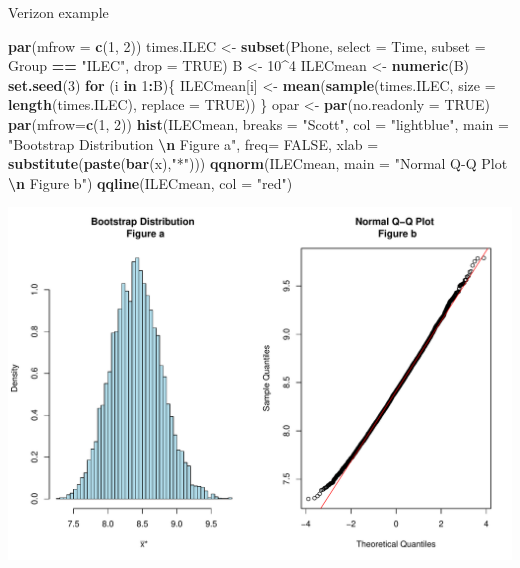 \documentclass[
  ignorenonframetext,
]{beamer}
\newenvironment{Shaded}{\begin{snugshade}}{\end{snugshade}}
\newcommand{\AttributeTok}[1]{\textcolor[rgb]{0.13,0.29,0.53}{#1}}
\newcommand{\ConstantTok}[1]{\textcolor[rgb]{0.56,0.35,0.01}{#1}}
\newcommand{\ControlFlowTok}[1]{\textcolor[rgb]{0.13,0.29,0.53}{\textbf{#1}}}
\newcommand{\DecValTok}[1]{\textcolor[rgb]{0.00,0.00,0.81}{#1}}
\newcommand{\FunctionTok}[1]{\textcolor[rgb]{0.13,0.29,0.53}{\textbf{#1}}}
\newcommand{\NormalTok}[1]{#1}
\newcommand{\OtherTok}[1]{\textcolor[rgb]{0.56,0.35,0.01}{#1}}
\newcommand{\SpecialCharTok}[1]{\textcolor[rgb]{0.81,0.36,0.00}{\textbf{#1}}}
\newcommand{\StringTok}[1]{\textcolor[rgb]{0.31,0.60,0.02}{#1}}
\begin{document}
\begin{frame}[fragile]{Verizon example}
\protect\hypertarget{verizon-example-2}{}
\tiny

\begin{Shaded}
\begin{Highlighting}[]
\FunctionTok{par}\NormalTok{(}\AttributeTok{mfrow =} \FunctionTok{c}\NormalTok{(}\DecValTok{1}\NormalTok{, }\DecValTok{2}\NormalTok{))}
\NormalTok{times.ILEC }\OtherTok{\textless{}{-}} \FunctionTok{subset}\NormalTok{(Phone, }\AttributeTok{select =}\NormalTok{ Time, }\AttributeTok{subset =}\NormalTok{ Group }\SpecialCharTok{==} \StringTok{"ILEC"}\NormalTok{, }\AttributeTok{drop =} \ConstantTok{TRUE}\NormalTok{)}
\NormalTok{B }\OtherTok{\textless{}{-}} \DecValTok{10}\SpecialCharTok{\^{}}\DecValTok{4}
\NormalTok{ILECmean }\OtherTok{\textless{}{-}} \FunctionTok{numeric}\NormalTok{(B)}
\FunctionTok{set.seed}\NormalTok{(}\DecValTok{3}\NormalTok{)}
\ControlFlowTok{for}\NormalTok{ (i }\ControlFlowTok{in} \DecValTok{1}\SpecialCharTok{:}\NormalTok{B)\{}
\NormalTok{ ILECmean[i] }\OtherTok{\textless{}{-}} \FunctionTok{mean}\NormalTok{(}\FunctionTok{sample}\NormalTok{(times.ILEC, }\AttributeTok{size =} \FunctionTok{length}\NormalTok{(times.ILEC), }\AttributeTok{replace =} \ConstantTok{TRUE}\NormalTok{)) }
\NormalTok{\}}
\NormalTok{opar }\OtherTok{\textless{}{-}} \FunctionTok{par}\NormalTok{(}\AttributeTok{no.readonly =} \ConstantTok{TRUE}\NormalTok{)}
\FunctionTok{par}\NormalTok{(}\AttributeTok{mfrow=}\FunctionTok{c}\NormalTok{(}\DecValTok{1}\NormalTok{, }\DecValTok{2}\NormalTok{))}
\FunctionTok{hist}\NormalTok{(ILECmean, }\AttributeTok{breaks =} \StringTok{"Scott"}\NormalTok{, }\AttributeTok{col =} \StringTok{"lightblue"}\NormalTok{, }
     \AttributeTok{main =} \StringTok{"Bootstrap Distribution }\SpecialCharTok{\textbackslash{}n}\StringTok{ Figure a"}\NormalTok{, }
     \AttributeTok{freq=} \ConstantTok{FALSE}\NormalTok{, }\AttributeTok{xlab =} \FunctionTok{substitute}\NormalTok{(}\FunctionTok{paste}\NormalTok{(}\FunctionTok{bar}\NormalTok{(x),}\StringTok{"*"}\NormalTok{)))}
\FunctionTok{qqnorm}\NormalTok{(ILECmean, }\AttributeTok{main =} \StringTok{"Normal Q{-}Q Plot }\SpecialCharTok{\textbackslash{}n}\StringTok{ Figure b"}\NormalTok{)}
\FunctionTok{qqline}\NormalTok{(ILECmean, }\AttributeTok{col =} \StringTok{"red"}\NormalTok{)}
\end{Highlighting}
\end{Shaded}

\begin{center}\includegraphics[width=0.6\linewidth,height=0.4\textheight]{Week10A_files/figure-beamer/unnamed-chunk-33-1} \end{center}
\normalsize
\end{frame}
\end{document}
